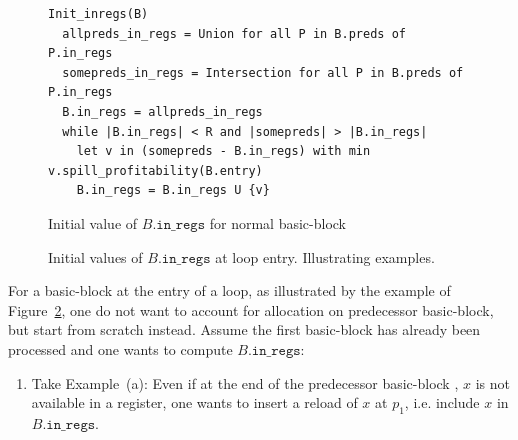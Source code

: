 {\begin{figure}
\begin{verbatim}
Init_inregs(B)
  allpreds_in_regs = Union for all P in B.preds of P.in_regs
  somepreds_in_regs = Intersection for all P in B.preds of P.in_regs
  B.in_regs = allpreds_in_regs
  while |B.in_regs| < R and |somepreds| > |B.in_regs|
    let v in (somepreds - B.in_regs) with min v.spill_profitability(B.entry)
    B.in_regs = B.in_regs U {v}
\end{verbatim}
\caption{\label{fig:ra:initnormal}Initial value of $B.\texttt{in\_regs}$ for normal basic-block}
\end{figure}

\begin{figure}
  \begin{center}
    \qquad
  \end{center}
  \caption{\label{fig:ra:loopentry_example}Initial values of $B.\texttt{in\_regs}$ at loop entry. Illustrating examples.}
\end{figure}
For a basic-block at the entry of a loop, as illustrated by the example of Figure~\ref{fig:ra:loopentry_example}, one do not want to account for allocation on predecessor basic-block, but start from scratch instead.
Assume the first basic-block has already been processed and one wants to compute $B.\texttt{in\_regs}$:
\begin{enumerate}
\item Take Example~(a): 
  Even if at the end of the predecessor basic-block , $x$ is not available in a register, one wants to insert a reload of $x$ at $p_1$, i.e. include $x$ in $B.\texttt{in\_regs}$.

\end{enumerate}}
